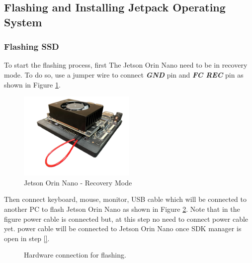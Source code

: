 \documentclass[12pt,hidelinks]{article}
\begin{document}
    \subsection{Flashing and Installing Jetpack Operating System}
    \label{subsec:flashing_jetpack}

        \subsubsection{Flashing SSD}
        \label{subsubsec:flashing}

        To start the flashing process, first The Jetson Orin Nano need to be in recovery mode. To do so, use a jumper wire to connect \textbf{\emph{GND}} pin and \textbf{\emph{FC REC}} pin as shown in Figure \ref{fig:jetson_recovery}. 

        \begin{figure}[ht] %
            \centering
            \includegraphics[width=0.5\textwidth]{pics/orin_nano_recovery_mode.png}
            \caption{Jetson Orin Nano - Recovery Mode}
            \label{fig:jetson_recovery}
        \end{figure}


        Then connect keyboard, mouse, monitor, USB cable which will be connected to another PC to flash Jetson Orin Nano as shown in Figure \ref{fig:setup_flashing}. Note that in the figure power cable is connected but, at this step no need to connect power cable yet. power cable will be connected to Jetson Orin Nano once SDK manager is open in step \ref{}.


         \begin{figure}[ht] %
            \centering
            \setlength{\fboxsep}{0pt}
            \setlength{\fboxrule}{1pt}
            \caption{Hardware connection for flashing.}
            \label{fig:setup_flashing}
        \end{figure}
\end{document}
